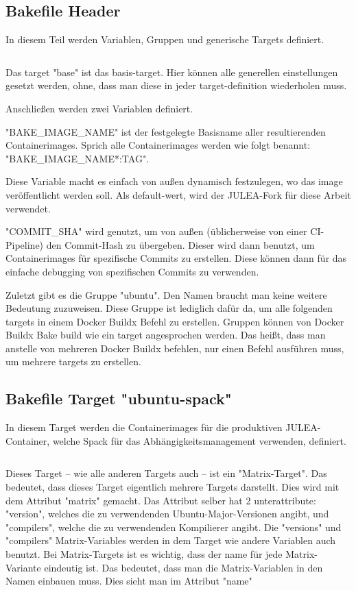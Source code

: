 \subsection{Bakefile Header}

In diesem Teil werden Variablen, Gruppen und generische Targets definiert.
\inputminted[firstline=1,lastline=7]{./lexers/docker-bake-lexer.py}{./code-examples/docker-bake.hcl}

Das target "base" ist das basis-target. Hier können alle generellen einstellungen gesetzt werden, ohne, dass man diese in jeder target-definition wiederholen muss. 

Anschließen werden zwei Variablen definiert. 

"BAKE\_IMAGE\_NAME" ist der festgelegte Basisname aller resultierenden Containerimages. Sprich alle Containerimages werden wie folgt benannt: "BAKE\_IMAGE\_NAME*:TAG".

Diese Variable macht es einfach von außen dynamisch festzulegen, wo das image veröffentlicht werden soll. Als default-wert, wird der JULEA-Fork für diese Arbeit verwendet.

"COMMIT\_SHA" wird genutzt, um von außen (üblicherweise von einer CI-Pipeline) den Commit-Hash zu übergeben. Dieser wird dann benutzt, um Containerimages für spezifische Commits zu erstellen. Diese können dann für das einfache debugging von spezifischen Commits zu verwenden.

Zuletzt gibt es die Gruppe "ubuntu". Den Namen braucht man keine weitere Bedeutung zuzuweisen. Diese Gruppe ist lediglich dafür da, um alle folgenden targets in einem Docker Buildx Befehl zu erstellen. Gruppen können von Docker Buildx Bake build wie ein target angesprochen werden. Das heißt, dass man anstelle von mehreren Docker Buildx befehlen, nur einen Befehl ausführen muss, um mehrere targets zu erstellen.

\subsection{Bakefile Target "ubuntu-spack"}

In diesem Target werden die Containerimages für die produktiven JULEA-Container, welche Spack für das Abhängigkeitsmanagement verwenden, definiert.

\inputminted[firstline=9,lastline=33]{./lexers/docker-bake-lexer.py}{./code-examples/docker-bake.hcl}

Dieses Target – wie alle anderen Targets auch – ist ein "Matrix-Target". Das bedeutet, dass dieses Target eigentlich mehrere Targets darstellt. Dies wird mit dem Attribut "matrix" gemacht. Das Attribut selber hat 2 unterattribute: "version", welches die zu verwendenden Ubuntu-Major-Versionen angibt, und "compilers", welche die zu verwendenden Kompilierer angibt.
Die "versions" und "compilers" Matrix-Variables werden in dem Target wie andere Variablen auch benutzt. 
Bei Matrix-Targets ist es wichtig, dass der name für jede Matrix-Variante eindeutig ist. Das bedeutet, dass man die Matrix-Variablen in den Namen einbauen muss. Dies sieht man im Attribut "name"

